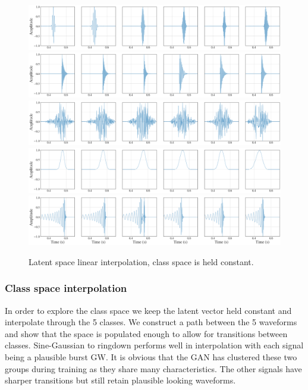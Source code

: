 \documentclass[12pt]{iopart}
\begin{document}
\begin{figure}
    \centering
    \includegraphics[width=\textwidth]{figures/generations/z_interp_sg.png}
    \includegraphics[width=\textwidth]{figures/generations/z_interp_rd.png}
    \includegraphics[width=\textwidth]{figures/generations/z_interp_wnb.png}
    \includegraphics[width=\textwidth]{figures/generations/z_interp_blip.png}
    \includegraphics[width=\textwidth]{figures/generations/z_interp_bbh.png}
    \caption{Latent space linear interpolation, class space is held constant.}
    \label{fig:z_interp}
\end{figure}

\subsubsection{Class space interpolation}
In order to explore the class space we keep the latent vector held constant and interpolate through the 5 classes. We construct a path between the 5 waveforms and show that the space is populated enough to allow for transitions between classes. Sine-Gaussian to ringdown performs well in interpolation with each signal being a plausible burst GW. It is obvious that the GAN has clustered these two groups during training as they share many characteristics. The other signals have sharper transitions but still retain plausible looking waveforms. 
\end{document}
